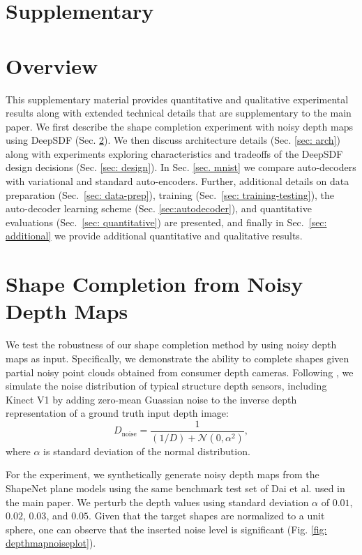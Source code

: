 \documentclass[10pt,twocolumn,letterpaper]{article}
\begin{document}
\appendix

\section*{Supplementary}
\section{Overview}
This supplementary material provides quantitative and qualitative experimental results along with extended technical details that are supplementary to the main paper. We first describe the shape completion experiment with noisy depth maps using DeepSDF (Sec. \ref{sec: noisy}). We then discuss architecture details (Sec. \ref{sec: arch}) along with experiments exploring characteristics and tradeoffs of the DeepSDF design decisions (Sec. \ref{sec: design}). In Sec. \ref{sec. mnist} we compare auto-decoders with variational and standard auto-encoders. Further, additional details on data preparation (Sec.~\ref{sec: data-prep}), training (Sec.~\ref{sec: training-testing}), the auto-decoder learning scheme (Sec. \ref{sec:autodecoder}), and quantitative evaluations (Sec.~\ref{sec: quantitative}) are presented, and finally in Sec.~\ref{sec: additional} we provide additional quantitative and qualitative results. 

\section{Shape Completion from Noisy Depth Maps} \label{sec: noisy}
We test the robustness of our shape completion method by using noisy depth maps as input. Specifically, we demonstrate the ability to complete shapes given partial noisy point clouds obtained from consumer depth cameras. Following \cite{handa2014benchmark}, we simulate the noise distribution of typical structure depth sensors, including Kinect V1 by adding zero-mean Guassian noise to the inverse depth representation of a ground truth input depth image:
\begin{equation}\label{eq: noise}
D_{\text{noise}}=\frac{1}{(1/D) + \mathcal{N}(0,\alpha^2)},
\end{equation}
where $\alpha$ is standard deviation of the normal distribution.

For the experiment, we synthetically generate noisy depth maps from the ShapeNet \cite{chang2015shapenet} plane models using the same benchmark test set of Dai et al. \cite{dai2017shape} used in the main paper. We perturb the depth values using standard deviation $\alpha$ of $0.01$, $0.02$, $0.03$, and $0.05$. Given that the target shapes are normalized to a unit sphere, one can observe that the inserted noise level is significant  (Fig. \ref{fig: depthmapnoiseplot}).
\end{document}
